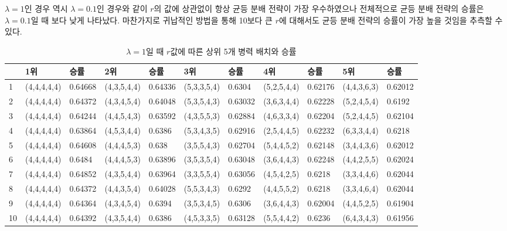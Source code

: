 $\lambda=1$인 경우 역시 $\lambda=0.1$인 경우와 같이 $r$의 값에 상관없이 항상 균등 분배 전략이 가장 우수하였으나 전체적으로 균등 분배 전략의 승률은 $\lambda=0.1$일 때 보다 낮게 나타났다. 마찬가지로 귀납적인 방법을 통해 10보다 큰 $r$에 대해서도 균등 분배 전략의 승률이 가장 높을 것임을 추측할 수 있다.

\begin{table}[htb!]
    \vspace{1em}
    \centering
    \caption{$\lambda = 1$일 때 $r$값에 따른 상위 5개 병력 배치와 승률}
    {\scriptsize
    \begin{tabular}{l|ll|ll|ll|ll|ll}
       & 1위       & 승률      & 2위       & 승률      & 3위       & 승률      & 4위       & 승률      & 5위       & 승률      \\ \hline
    1  & (4,4,4,4,4) & 0.64668 & (4,3,5,4,4) & 0.64336 & (5,3,3,5,4) & 0.6304  & (5,2,5,4,4) & 0.62176 & (4,4,3,6,3) & 0.62012 \\
    2  & (4,4,4,4,4) & 0.64372 & (4,3,4,5,4) & 0.64048 & (5,3,5,4,3) & 0.63032 & (3,6,3,4,4) & 0.62228 & (5,2,4,5,4) & 0.6192  \\
    3  & (4,4,4,4,4) & 0.64244 & (4,4,5,4,3) & 0.63592 & (4,3,5,5,3) & 0.62884 & (4,6,3,3,4) & 0.62204 & (5,2,4,4,5) & 0.62104 \\
    4  & (4,4,4,4,4) & 0.63864 & (4,5,3,4,4) & 0.6386  & (5,3,4,3,5) & 0.62916 & (2,5,4,4,5) & 0.62232 & (6,3,3,4,4) & 0.6218  \\
    5  & (4,4,4,4,4) & 0.64608 & (4,4,4,5,3) & 0.638   & (3,5,5,4,3) & 0.62704 & (5,4,4,5,2) & 0.62148 & (3,4,4,3,6) & 0.62012 \\
    6  & (4,4,4,4,4) & 0.6484  & (4,4,4,5,3) & 0.63896 & (3,5,3,5,4) & 0.63048 & (3,6,4,4,3) & 0.62248 & (4,4,2,5,5) & 0.62024 \\
    7  & (4,4,4,4,4) & 0.64852 & (4,3,5,4,4) & 0.63964 & (3,3,5,5,4) & 0.63056 & (4,5,4,2,5) & 0.6218  & (3,3,4,4,6) & 0.62044 \\
    8  & (4,4,4,4,4) & 0.64372 & (4,4,3,5,4) & 0.64028 & (5,5,3,4,3) & 0.6292  & (4,4,5,5,2) & 0.6218  & (3,3,4,6,4) & 0.62044 \\
    9  & (4,4,4,4,4) & 0.64364 & (4,3,4,5,4) & 0.6394  & (3,5,3,4,5) & 0.6306  & (3,6,4,4,3) & 0.62004 & (4,4,5,2,5) & 0.61904 \\
    10 & (4,4,4,4,4) & 0.64392 & (4,3,5,4,4) & 0.6386  & (4,5,3,3,5) & 0.63128 & (5,5,4,4,2) & 0.6236  & (6,4,3,4,3) & 0.61956
    \end{tabular}
    }
    \label{tab:my_label}
\end{table}

